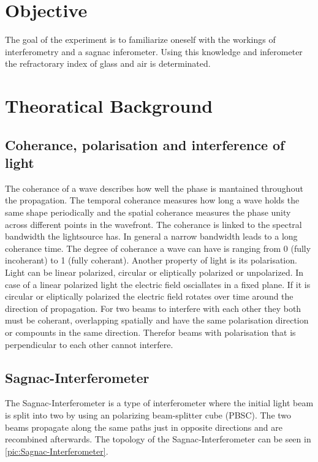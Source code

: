 \section{Objective}
\label{sec:Objective}
The goal of the experiment is to familiarize oneself with the workings of interferometry and a sagnac 
inferometer. Using this knowledge and inferometer the refractorary index of glass and air is determinated. 
\section{Theoratical Background}
\label{sec:Theorie}
\subsection{Coherance, polarisation  and interference of light}
The coherance of a wave describes how well the phase is mantained throughout the propagation. The temporal coherance measures how long a 
wave holds the same shape periodically and the spatial coherance measures the phase unity across different points in the wavefront.
The coherance is linked to the spectral bandwidth the lightsource has. In general a narrow bandwidth leads to a long coherance time.
The degree of coherance a wave can have is ranging from 0 (fully incoherant) to 1 (fully coherant). 
Another property of light is its polarisation. Light can be linear polarized, circular or eliptically polarized or unpolarized. 
In case of a linear polarized light the electric field osciallates in a fixed plane. If it is circular or eliptically polarized the 
electric field rotates over time around the direction of propagation. 
For two beams to interfere with each other they both must be coherant, overlapping spatially and have the same polarisation direction or
compounts in the same direction. Therefor beams with polarisation that is perpendicular to each other cannot interfere. 

\subsection{Sagnac-Interferometer}
The Sagnac-Interferometer is a type of interferometer where the initial light beam is split into two by using an polarizing beam-splitter 
cube (PBSC). The two beams propagate along the same paths just in opposite directions and are recombined afterwards. 
The topology of the Sagnac-Interferometer can be seen in \autoref{pic:Sagnac-Interferometer}.

